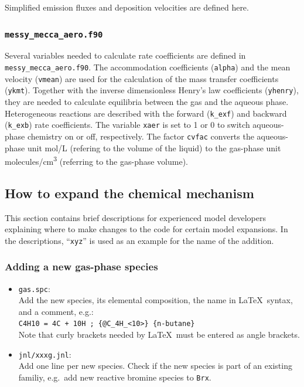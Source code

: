 \documentclass[twoside]{article}
\def\nosep{\setlength\parsep{0mm}\setlength\topsep{0mm}\setlength\itemsep{0mm}}
\begin{document}
Simplified emission fluxes and deposition velocities are defined here.

\subsubsection{{\tt messy\_mecca\_aero.f90}}

Several variables needed to calculate rate coefficients are defined in
\verb|messy_mecca_aero.f90|. The accommodation coefficients
(\verb|alpha|) and the mean velocity (\verb|vmean|) are used for the
calculation of the mass transfer coefficients (\verb|ykmt|). Together
with the inverse dimensionless Henry's law coefficients (\verb|yhenry|),
they are needed to calculate equilibria between the gas and the aqueous
phase. Heterogeneous reactions are described with the forward
(\verb|k_exf|) and backward (\verb|k_exb|) rate coefficients. The
variable \verb|xaer| is set to 1 or 0 to switch aqueous-phase chemistry
on or off, respectively. The factor \verb|cvfac| converts the
aqueous-phase unit \unit{mol/L} (refering to the volume of the liquid)
to the gas-phase unit \unit{molecules/cm^3} (referring to the gas-phase
volume).

\subsection{How to expand the chemical mechanism}

This section contains brief descriptions for experienced model
developers explaining where to make changes to the code for certain
model expansions. In the descriptions, ``\verb|xyz|'' is used as an
example for the name of the addition.

\subsubsection{Adding a new gas-phase species}

\begin{itemize}\nosep
\item \verb|gas.spc|:\\
  Add the new species, its elemental composition,
  the name in La\TeX\ syntax, and a comment, e.g.:\\
  \verb|C4H10 = 4C + 10H ; {@C_4H_<10>} {n-butane}|\\
  Note that curly brackets needed by La\TeX\ must be entered as angle
  brackets.
\end{itemize}

\begin{itemize}\nosep
\item \verb|jnl/xxxg.jnl|:\\
  Add one line per new species. Check if the new species is part of an
  existing familiy, e.g.\ add new reactive bromine species to
  \verb|Brx|.
\end{itemize}
\end{document}
